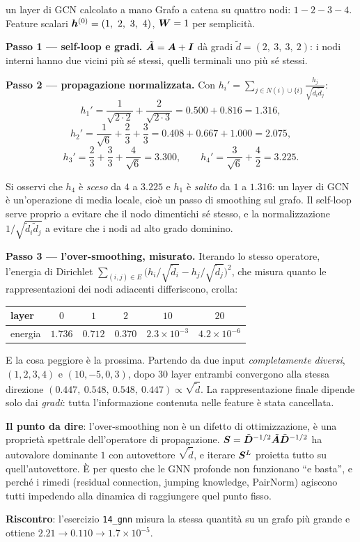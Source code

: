 \begin{esempiosvolto}{un layer di GCN calcolato a mano}
Grafo a catena su quattro nodi: $1 - 2 - 3 - 4$. Feature scalari $\vect{h}^{(0)} = (1,\ 2,\ 3,\ 4)$, $\bm{W} = 1$ per semplicità.

\textbf{Passo 1 — self-loop e gradi.} $\tilde{\bm{A}} = \bm{A} + \bm{I}$ dà gradi $\tilde d = (2,\ 3,\ 3,\ 2)$: i nodi interni hanno due vicini più sé stessi, quelli terminali uno più sé stessi.

\textbf{Passo 2 — propagazione normalizzata.} Con $h_i' = \sum_{j \in N(i) \cup \{i\}} \frac{h_j}{\sqrt{\tilde d_i \tilde d_j}}$:
\[
h_1' = \frac{1}{\sqrt{2 \cdot 2}} + \frac{2}{\sqrt{2 \cdot 3}} = 0.500 + 0.816 = 1.316,
\]
\[
h_2' = \frac{1}{\sqrt{6}} + \frac{2}{3} + \frac{3}{3} = 0.408 + 0.667 + 1.000 = 2.075,
\]
\[
h_3' = \frac{2}{3} + \frac{3}{3} + \frac{4}{\sqrt{6}} = 3.300, \qquad
h_4' = \frac{3}{\sqrt{6}} + \frac{4}{2} = 3.225.
\]

Si osservi che $h_4$ è \emph{sceso} da $4$ a $3.225$ e $h_1$ è \emph{salito} da $1$ a $1.316$: un layer di GCN è un'operazione di media locale, cioè un passo di smoothing sul grafo. Il self-loop serve proprio a evitare che il nodo dimentichi sé stesso, e la normalizzazione $1/\sqrt{\tilde d_i \tilde d_j}$ a evitare che i nodi ad alto grado dominino.

\medskip
\textbf{Passo 3 — l'over-smoothing, misurato.} Iterando lo stesso operatore, l'energia di Dirichlet $\sum_{(i,j) \in E} \big(h_i/\sqrt{\tilde d_i} - h_j/\sqrt{\tilde d_j}\big)^2$, che misura quanto le rappresentazioni dei nodi adiacenti differiscono, crolla:
\begin{center}
\begin{tabular}{lccccc}
\toprule
layer & $0$ & $1$ & $2$ & $10$ & $20$ \\
\midrule
energia & $1.736$ & $0.712$ & $0.370$ & $2.3\times 10^{-3}$ & $4.2 \times 10^{-6}$ \\
\bottomrule
\end{tabular}
\end{center}

E la cosa peggiore è la prossima. Partendo da due input \emph{completamente diversi}, $(1,2,3,4)$ e $(10,-5,0,3)$, dopo $30$ layer entrambi convergono alla stessa direzione $(0.447,\ 0.548,\ 0.548,\ 0.447) \propto \sqrt{\tilde d}$. La rappresentazione finale dipende solo dai \emph{gradi}: tutta l'informazione contenuta nelle feature è stata cancellata.

\textbf{Il punto da dire}: l'over-smoothing non è un difetto di ottimizzazione, è una proprietà spettrale dell'operatore di propagazione. $\bm{S} = \tilde{\bm{D}}^{-1/2}\tilde{\bm{A}}\tilde{\bm{D}}^{-1/2}$ ha autovalore dominante $1$ con autovettore $\sqrt{\tilde d}$, e iterare $\bm{S}^L$ proietta tutto su quell'autovettore. È per questo che le GNN profonde non funzionano ``e basta'', e perché i rimedi (residual connection, jumping knowledge, PairNorm) agiscono tutti impedendo alla dinamica di raggiungere quel punto fisso.

\textbf{Riscontro}: l'esercizio \texttt{14\_gnn} misura la stessa quantità su un grafo più grande e ottiene $2.21 \to 0.110 \to 1.7\times 10^{-5}$.
\end{esempiosvolto}

